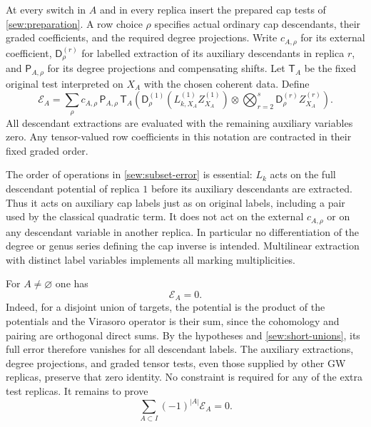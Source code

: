 At every switch in $A$ and in every replica insert the prepared cap
tests of \cref{sew:preparation}.  A row choice $\rho$ specifies actual
ordinary cap descendants, their graded coefficients, and the required
degree projections.  Write $c_{A,\rho}$ for its external coefficient,
$\mathsf D_{\rho}^{(r)}$ for labelled extraction of its auxiliary
descendants in replica $r$, and $\mathsf P_{A,\rho}$ for its degree
projections and compensating shifts.  Let $\mathsf T_A$ be the fixed
original test interpreted on $X_A$ with the chosen coherent data.
Define
\begin{equation}\label{sew:subset-error}
 \mathcal E_A=
 \sum_{\rho} c_{A,\rho}\,\mathsf P_{A,\rho}\,
 \mathsf T_A\left(
  \mathsf D_{\rho}^{(1)}(L_{k,X_A}^{(1)}Z_{X_A}^{(1)})
  \otimes\bigotimes_{r=2}^{s}
       \mathsf D_{\rho}^{(r)}Z_{X_A}^{(r)}
 \right).
\end{equation}
All descendant extractions are evaluated with the remaining
auxiliary variables zero.  Any tensor-valued row coefficients in this
notation are contracted in their fixed graded order.

The order of operations in \eqref{sew:subset-error} is essential:
$L_k$ acts on the full descendant potential of replica $1$ before its
auxiliary descendants are extracted.  Thus it acts on auxiliary cap
labels just as on original labels, including a pair used by the
classical quadratic term.  It does not act on the external
$c_{A,\rho}$ or on any descendant variable in another replica.  In
particular no differentiation of the degree or genus series defining
the cap inverse is intended.  Multilinear extraction with distinct
label variables implements all marking multiplicities.

For $A\ne\varnothing$ one has
\begin{equation}\label{sew:nonempty-zero}
 \mathcal E_A=0.
\end{equation}
Indeed, for a disjoint union of targets, the potential is the product
of the potentials and the Virasoro operator is their sum, since the
cohomology and pairing are orthogonal direct sums.  By the hypotheses
and \eqref{sew:short-unions}, its full error therefore vanishes for all
descendant labels.  The auxiliary extractions, degree projections,
and graded tensor tests, even those supplied by other GW replicas,
preserve that zero identity.  No constraint is required for any of
the extra test replicas.  It remains to prove
\begin{equation}\label{sew:alternating-zero}
 \sum_{A\subset I}(-1)^{|A|}\mathcal E_A=0.
\end{equation}

